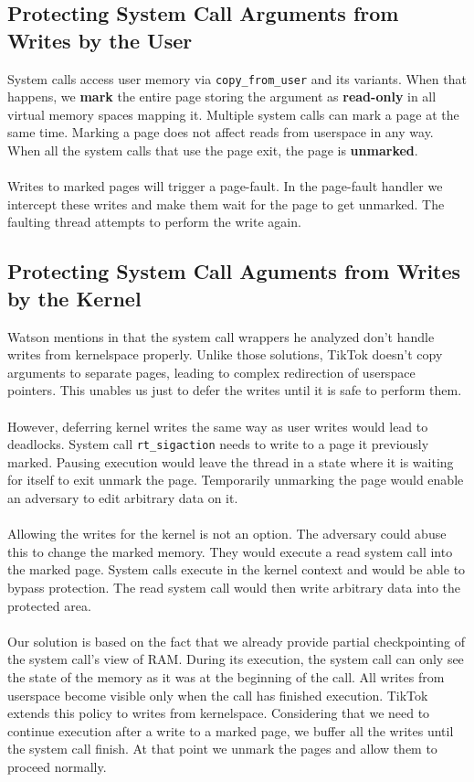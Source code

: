 \documentclass[conference]{IEEEtran}
\begin{document}
\subsection{Protecting System Call Arguments from Writes by the User}

System calls access user memory via \texttt{copy\_from\_user} and its variants. When that happens, 
we \textbf{mark} the entire page storing the argument as \textbf{read-only} in all virtual memory spaces 
mapping it. Multiple system calls can mark a page at the same time. Marking a page does not affect reads
from userspace in any way.  When all the system calls that use the page exit, the page is \textbf{unmarked}.
\\
\\
Writes to marked pages will trigger a page-fault. In the page-fault handler we intercept these writes 
and make them wait for the page to get unmarked. The faulting thread attempts to perform the
write again.

\subsection{Protecting System Call Aguments from Writes by the Kernel}

Watson mentions in \cite{watson} that the system call wrappers he analyzed don't handle writes from kernelspace
properly. Unlike those solutions, TikTok doesn't copy arguments to separate pages, leading to complex redirection 
of userspace pointers. This unables us just to defer the writes until it is safe to perform them.
\\
\\
However, deferring kernel writes the same way as user writes would lead to deadlocks. System call \texttt{rt\_sigaction}
needs to write to a page it previously marked. Pausing execution would leave the thread in a state where it is waiting for itself
to exit unmark the page. Temporarily unmarking the page would enable an adversary to edit arbitrary data on it.
\\
\\
Allowing the writes for the kernel is not an option. The adversary could abuse this to change the marked memory. 
They would execute a read system call into the marked page. System calls execute in the kernel context and would 
be able to bypass protection. The read system call would then write arbitrary data into the protected area.
\\
\\
Our solution is based on the fact that we already provide partial checkpointing of the system call's view of RAM.
During its execution, the system call can only see the state of the memory as it was at the beginning of the call.
All writes from userspace become visible only when the call has finished execution. TikTok extends this policy to 
writes from kernelspace. Considering that we need to continue execution after a write to a marked page, we buffer 
all the writes until the system call finish. At that point we unmark the pages and allow them to proceed normally.
\end{document}
